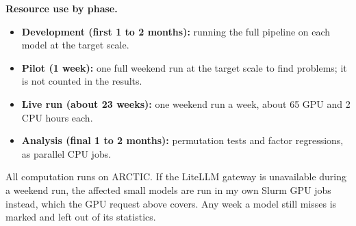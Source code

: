 \documentclass[11pt,letterpaper]{article}
\begin{document}
\textbf{Resource use by phase.}
\begin{itemize}
\item \textbf{Development (first 1 to 2 months):} running the full pipeline on each model at the target scale.
\item \textbf{Pilot (1 week):} one full weekend run at the target scale to find problems; it is not counted in the results.
\item \textbf{Live run (about 23 weeks):} one weekend run a week, about 65 GPU and 2 CPU hours each.
\item \textbf{Analysis (final 1 to 2 months):} permutation tests and factor regressions, as parallel CPU jobs.
\end{itemize}
All computation runs on ARCTIC. If the LiteLLM gateway is unavailable during a weekend run, the affected small models are run in my own Slurm GPU jobs instead, which the GPU request above covers. Any week a model still misses is marked and left out of its statistics.
\end{document}
